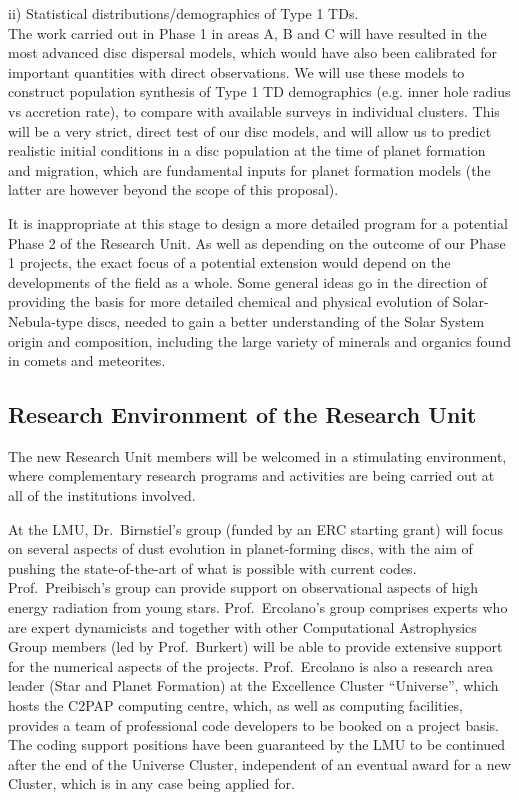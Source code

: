 \documentclass[10pt,fleqn,twoside]{article}
\begin{document}
ii) Statistical distributions/demographics of Type 1 TDs. \\
The work carried out in Phase 1 in areas A, B and C will have resulted
in the most advanced disc dispersal models, which would have also been
calibrated for important quantities with direct observations. We will
use these models to construct population synthesis of Type 1
TD demographics (e.g. inner hole radius vs accretion
rate), to compare with available surveys in individual clusters.  
This will be a very strict, direct test of our disc models, and will
allow us to predict realistic initial conditions in a disc population at the
time of planet formation and migration, which are fundamental inputs
for planet formation models (the latter are however beyond the scope of this
proposal).  

It is inappropriate at this stage to design a more detailed program
for a potential Phase 2 of the Research Unit. As well as depending on
the outcome of our Phase 1 projects, the exact focus of a potential
extension would depend on the developments of the field as a
whole. Some general ideas go in the direction of providing the basis for more detailed chemical
and physical evolution of Solar-Nebula-type discs, needed to gain a
better understanding of the Solar System origin and composition,
including the large variety of minerals and organics found in comets
and meteorites. 
\vspace{0.8em}

\subsection{Research Environment of the Research Unit}

The new Research Unit members will be welcomed in a stimulating
environment, where complementary research programs and activities are
being carried out at all of the institutions involved. 

At the LMU, Dr.\ Birnstiel's group (funded by an ERC starting grant)
will focus on several aspects of dust evolution in planet-forming
discs, with the aim of pushing the state-of-the-art of what is
possible with current codes. Prof.~Preibisch's group can provide
support on observational aspects of high energy radiation from young
stars. Prof.~Ercolano's group comprises experts who are expert
dynamicists
and together with other Computational Astrophysics Group members (led
by Prof.~Burkert) will be
able to provide extensive support for the numerical aspects of the
projects. Prof.~Ercolano is also a research area leader (Star and
Planet Formation) at the
Excellence Cluster ``Universe'', which hosts the C2PAP computing
centre, which, as well as computing facilities, provides a team of
professional code developers to be booked on a project basis. The
coding support positions have been guaranteed by the LMU to be
continued after the end of the Universe Cluster, independent of an
eventual award for a new Cluster, which is in any case being applied for. 
\end{document}
